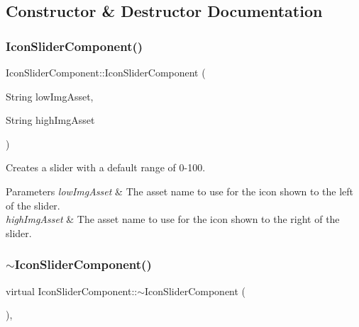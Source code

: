 \subsection{Constructor \& Destructor Documentation}
\mbox{\label{classIconSliderComponent_a09673cf0d38e4d7d03f27ba2c539984e}} 
\subsubsection{\texorpdfstring{Icon\+Slider\+Component()}{IconSliderComponent()}}
{\footnotesize\ttfamily Icon\+Slider\+Component\+::\+Icon\+Slider\+Component (\begin{DoxyParamCaption}\item[{String}]{low\+Img\+Asset,  }\item[{String}]{high\+Img\+Asset }\end{DoxyParamCaption})}

Creates a slider with a default range of 0-\/100.


\begin{DoxyParams}{Parameters}
{\em low\+Img\+Asset} & The asset name to use for the icon shown to the left of the slider.\\
\hline
{\em high\+Img\+Asset} & The asset name to use for the icon shown to the right of the slider. \\
\hline
\end{DoxyParams}
\mbox{\label{classIconSliderComponent_a10748ba0866a0ff945b48543f2952272}} 
\subsubsection{\texorpdfstring{$\sim$\+Icon\+Slider\+Component()}{~IconSliderComponent()}}
{\footnotesize\ttfamily virtual Icon\+Slider\+Component\+::$\sim$\+Icon\+Slider\+Component (\begin{DoxyParamCaption}{ }\end{DoxyParamCaption})\hspace{0.3cm}{\ttfamily [inline]}, {\ttfamily [virtual]}}



